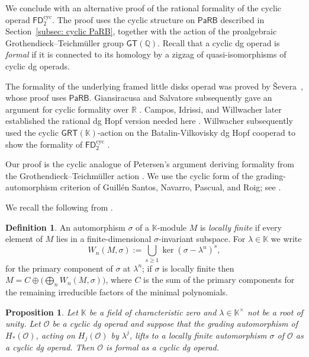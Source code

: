 \documentclass{amsart}
\newcommand{\calO}{\mathcal{O}}
\newcommand{\kk}{\mathbb{K}}    %
\newcommand{\PaRB}{\mathsf{PaRB}}
\newcommand{\gt}{\mathsf{GT}}
\newtheorem{prop}[theorem]{Proposition}%
\theoremstyle{definition}
\newtheorem{definition}[theorem]{Definition}%
\numberwithin{equation}{section}
\begin{document}
We conclude with an alternative proof of the rational formality of the cyclic operad $\mathsf{FD}_2^{\mathrm{cyc}}$. The proof uses the cyclic structure on $\PaRB$ described in Section~\ref{subsec: cyclic PaRB}, together with the action of the proalgebraic Grothendieck--Teichmüller group $\gt(\mathbb Q)$. Recall that a cyclic dg operad is \emph{formal} if it is connected to its homology by a zigzag of quasi-isomorphisms of cyclic dg operads.

The formality of the underlying framed little disks operad was proved by \v{S}evera~\cite{severa2009formality}, whose proof uses $\PaRB$. Giansiracusa and Salvatore subsequently gave an argument for cyclic formality over $\mathbb R$ \cite[Theorem~A]{Salvatore_2012_cyclic_formality}. Campos, Idrissi, and Willwacher later established the rational dg Hopf version needed here \cite[Section~3.1 and Theorem~3.1]{campos2019configuration}. Willwacher subsequently used the cyclic $\mathsf{GRT}(\kk)$-action on the Batalin-Vilkovisky dg Hopf cooperad to show the formality of $\mathsf{FD}_2^{\mathrm{cyc}}$ \cite[Section 5.3]{willwacher2024cyclic}.

Our proof is the cyclic analogue of Petersen's argument deriving formality from the Grothendieck--Teichmüller action \cite{petersen_formality}. We use the cyclic form of the grading-automorphism criterion of Guillén Santos, Navarro, Pascual, and Roig; see \cite[Corollary~5.2.2]{GNPR}.

We recall the following from \cite[Section~5]{GNPR}.

\begin{definition}\label{def:locally_finite}
An automorphism $\sigma$ of a $\kk$-module $M$ is \emph{locally finite} if every element of
$M$ lies in a finite-dimensional $\sigma$-invariant subspace.  For $\lambda\in\kk$ we write
\[W_n(M,\sigma) :=\bigcup_{s\ge1}\ker(\sigma-\lambda^{n})^{s},\] for the primary component of
$\sigma$ at $\lambda^{n}$; if $\sigma$ is locally finite then
$M=C\oplus \big(\bigoplus_{n}W_n(M,\sigma) \big)$, where $C$ is the sum of the primary components for the
remaining irreducible factors of the minimal polynomials.
\end{definition}


\begin{prop}\label{prop: cyclic grading formality criterion}
Let $\kk$ be a field of characteristic zero and $\lambda\in\kk^{\times}$ not be a root of
unity. Let $\calO$ be a cyclic dg operad and suppose that the grading automorphism of
$H_{\ast}(\calO)$, acting on $H_{j}(\calO)$ by $\lambda^{j}$, lifts to a locally finite
automorphism $\sigma$ of $\calO$ as a cyclic dg operad. Then $\calO$ is formal as a
cyclic dg operad.
\end{prop}
\end{document}
